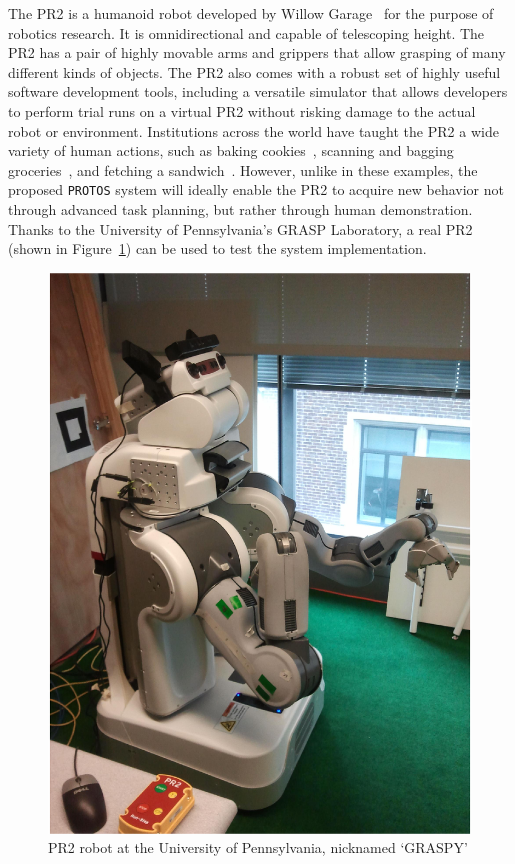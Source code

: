 \documentclass{sig-alternate}
\begin{document}
\indent The PR2 is a humanoid robot developed by  Willow Garage~\cite{pr2} for the purpose of robotics 
research. It is omnidirectional and capable of telescoping height. The PR2 has a pair of highly movable arms and grippers
that allow grasping of many different kinds of objects. The PR2 also comes with a robust set of highly useful software development tools,
including a versatile simulator that allows developers to perform trial runs on a virtual PR2 without
risking damage to the actual robot or environment. Institutions across the
world have taught the PR2 a wide variety of human actions, such as baking 
cookies~\cite{cookies}, scanning and bagging groceries~\cite{groceries}, and fetching a sandwich~\cite{subway}.
 However, unlike in these examples, the proposed {\tt PROTOS} system will ideally enable the PR2 to acquire new behavior not through advanced task planning,
but rather through human demonstration. Thanks to the University of Pennsylvania's GRASP Laboratory, a real PR2 (shown in Figure~\ref{fig:pr2_photo}) can be used to test the
system implementation.

\begin{figure}[htb] 
	\begin{center}
		\includegraphics[width=0.8\linewidth]{graspy}
	\end{center}
	\caption{PR2 robot at the University of Pennsylvania, nicknamed `GRASPY'}
	\label{fig:pr2_photo}
\end{figure}
\end{document}
